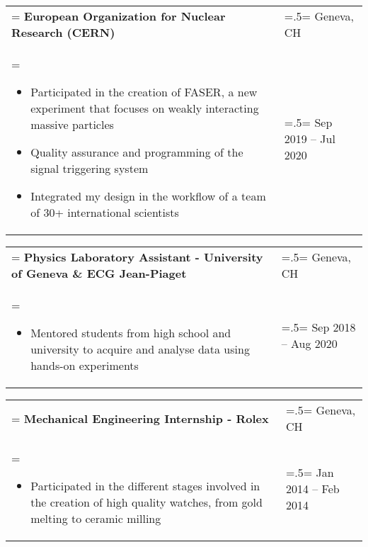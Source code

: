 \documentclass[letterpaper, 11pt]{article}
\begin{document}
\begin{tabularx}{1.0\textwidth} { 
   >{\raggedright\arraybackslash\hsize=1.5\hsize\linewidth=\hsize}X 
   >{\raggedleft\arraybackslash\hsize=.5\hsize\linewidth=\hsize}X }
\normalsize
\bf{European Organization for Nuclear Research (CERN)} & Geneva, CH\\
\normalfont \begin{itemize}[leftmargin=*,noitemsep,topsep=0pt]
\item Participated in the creation of FASER, a new experiment that focuses on weakly interacting massive particles
\item Quality assurance and programming of the signal triggering system
\item Integrated my design in the workflow of a team of 30+ international scientists
\end{itemize} & Sep 2019 -- Jul 2020
\end{tabularx}

\begin{tabularx}{1.0\textwidth} { 
   >{\raggedright\arraybackslash\hsize=1.5\hsize\linewidth=\hsize}X 
   >{\raggedleft\arraybackslash\hsize=.5\hsize\linewidth=\hsize}X }
\normalsize
\bf{Physics Laboratory Assistant - University of Geneva \& ECG Jean-Piaget} & Geneva, CH\\
\normalfont \begin{itemize}[leftmargin=*,noitemsep,topsep=0pt]
\item Mentored students from high school and university to acquire and analyse data using hands-on experiments
\end{itemize} & Sep 2018 -- Aug 2020
\end{tabularx}

\begin{tabularx}{1.0\textwidth} { 
   >{\raggedright\arraybackslash\hsize=1.5\hsize\linewidth=\hsize}X 
   >{\raggedleft\arraybackslash\hsize=.5\hsize\linewidth=\hsize}X }
\normalsize
\bf{Mechanical Engineering Internship - Rolex} & Geneva, CH\\
\normalfont \begin{itemize}[leftmargin=*,noitemsep,topsep=0pt]
\item Participated in the different stages involved in the creation of high quality watches, from gold melting to ceramic milling
\end{itemize} & Jan 2014 --  Feb 2014
\end{tabularx}
\end{document}
